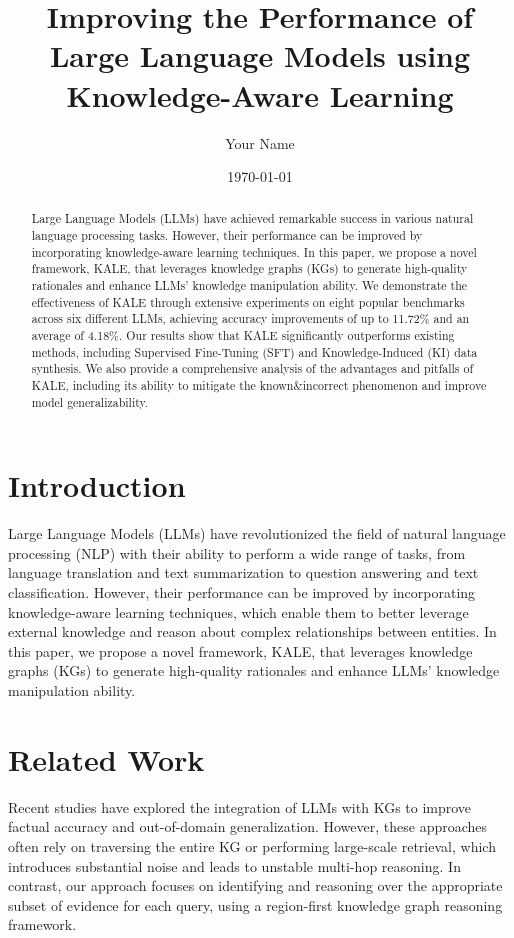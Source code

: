 \documentclass{article}
\begin{document}
        \title{Improving the Performance of Large Language Models using Knowledge-Aware Learning}
        \author{Your Name}
        \date{\today}
        \maketitle
        \begin{abstract}
        Large Language Models (LLMs) have achieved remarkable success in various natural language processing tasks. However, their performance can be improved by incorporating knowledge-aware learning techniques. In this paper, we propose a novel framework, KALE, that leverages knowledge graphs (KGs) to generate high-quality rationales and enhance LLMs' knowledge manipulation ability. We demonstrate the effectiveness of KALE through extensive experiments on eight popular benchmarks across six different LLMs, achieving accuracy improvements of up to 11.72\% and an average of 4.18\%. Our results show that KALE significantly outperforms existing methods, including Supervised Fine-Tuning (SFT) and Knowledge-Induced (KI) data synthesis. We also provide a comprehensive analysis of the advantages and pitfalls of KALE, including its ability to mitigate the known&incorrect phenomenon and improve model generalizability.
        \end{abstract}
        \section{Introduction}
        Large Language Models (LLMs) have revolutionized the field of natural language processing (NLP) with their ability to perform a wide range of tasks, from language translation and text summarization to question answering and text classification. However, their performance can be improved by incorporating knowledge-aware learning techniques, which enable them to better leverage external knowledge and reason about complex relationships between entities. In this paper, we propose a novel framework, KALE, that leverages knowledge graphs (KGs) to generate high-quality rationales and enhance LLMs' knowledge manipulation ability.

        \section{Related Work}
        Recent studies have explored the integration of LLMs with KGs to improve factual accuracy and out-of-domain generalization. However, these approaches often rely on traversing the entire KG or performing large-scale retrieval, which introduces substantial noise and leads to unstable multi-hop reasoning. In contrast, our approach focuses on identifying and reasoning over the appropriate subset of evidence for each query, using a region-first knowledge graph reasoning framework.
\end{document}
